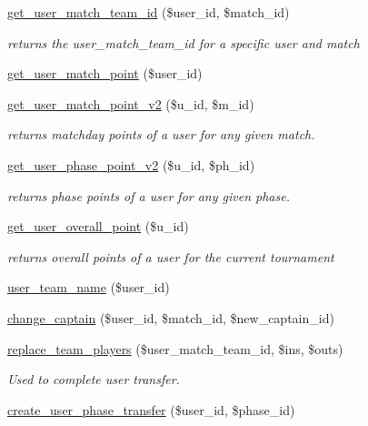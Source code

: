 \begin{DoxyCompactItemize}
\hyperlink{class_user__model_a27ae7e0b4c129bc6060cd152496fbd66}{get\+\_\+user\+\_\+match\+\_\+team\+\_\+id} (\$user\+\_\+id, \$match\+\_\+id)
\begin{DoxyCompactList}\small\item\em returns the user\+\_\+match\+\_\+team\+\_\+id for a specific user and match \end{DoxyCompactList}\item 
\hyperlink{class_user__model_a37928a3db05e29218412e5c1e7b8d1a1}{get\+\_\+user\+\_\+match\+\_\+point} (\$user\+\_\+id)
\item 
\hyperlink{class_user__model_a465e90e3e0f3445c300bc1ccd69f1a07}{get\+\_\+user\+\_\+match\+\_\+point\+\_\+v2} (\$u\+\_\+id, \$m\+\_\+id)
\begin{DoxyCompactList}\small\item\em returns matchday points of a user for any given match. \end{DoxyCompactList}\item 
\hyperlink{class_user__model_a5dc43dd25445e2024e038909d0617a65}{get\+\_\+user\+\_\+phase\+\_\+point\+\_\+v2} (\$u\+\_\+id, \$ph\+\_\+id)
\begin{DoxyCompactList}\small\item\em returns phase points of a user for any given phase. \end{DoxyCompactList}\item 
\hyperlink{class_user__model_aca6bd04f4f18a4003e991aaacdc48d8d}{get\+\_\+user\+\_\+overall\+\_\+point} (\$u\+\_\+id)
\begin{DoxyCompactList}\small\item\em returns overall points of a user for the current tournament \end{DoxyCompactList}\item 
\hyperlink{class_user__model_a72c1bccab8a3d0b4c23751d18aa73bf9}{user\+\_\+team\+\_\+name} (\$user\+\_\+id)
\item 
\hyperlink{class_user__model_a2efb5b80dc97c4b8bd5113082373f0bd}{change\+\_\+captain} (\$user\+\_\+id, \$match\+\_\+id, \$new\+\_\+captain\+\_\+id)
\item 
\hyperlink{class_user__model_a557a7229f49a6eb08e689d5e5e206e1f}{replace\+\_\+team\+\_\+players} (\$user\+\_\+match\+\_\+team\+\_\+id, \$ins, \$outs)
\begin{DoxyCompactList}\small\item\em Used to complete user transfer. \end{DoxyCompactList}\item 
\hyperlink{class_user__model_a25fb351800264a943c8d9d70385ac1a4}{create\+\_\+user\+\_\+phase\+\_\+transfer} (\$user\+\_\+id, \$phase\+\_\+id)

\end{DoxyCompactItemize}

